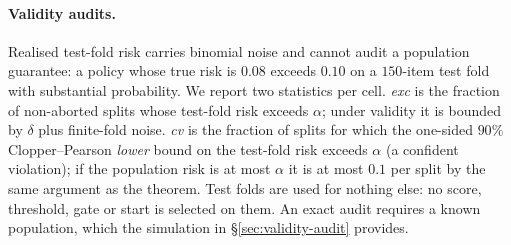 \paragraph{Validity audits.}
Realised test-fold risk carries binomial noise and cannot audit a population guarantee: a policy whose true risk is
$0.08$ exceeds $0.10$ on a $150$-item test fold with substantial probability. We report two statistics per
cell. \emph{exc} is the fraction of non-aborted splits whose test-fold risk exceeds $\alpha$; under validity it
is bounded by $\delta$ plus finite-fold noise. \emph{cv} is the fraction of splits for which the one-sided
$90\%$ Clopper--Pearson \emph{lower} bound on the test-fold risk exceeds $\alpha$ (a confident violation); if the
population risk is at most $\alpha$ it is at most $0.1$ per split by the same argument as the theorem. Test folds
are used for nothing else: no score, threshold, gate or start is selected on them. An exact audit requires a known
population, which the simulation in \S\ref{sec:validity-audit} provides.
